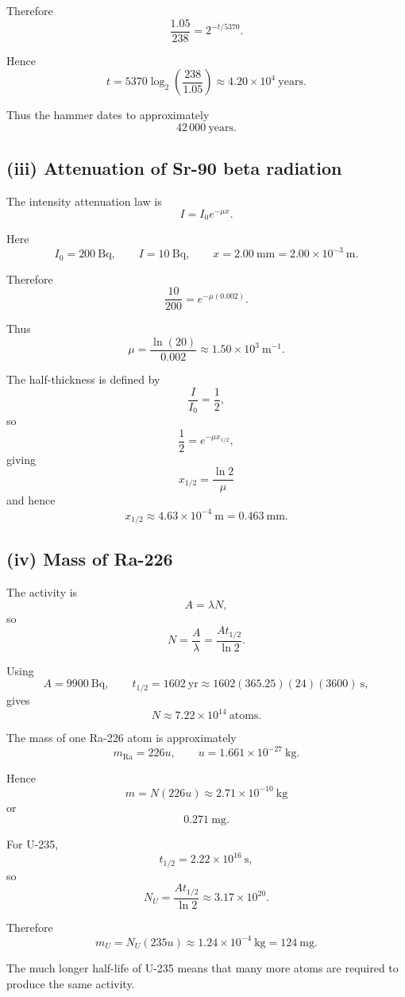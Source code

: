 \documentclass[11pt,a4paper]{article}
\begin{document}
Therefore
\[
\frac{1.05}{238}
=
2^{-t/5370}.
\]

Hence
\[
t
=
5370
\log_2\left(\frac{238}{1.05}\right)
\approx
\boxed{4.20\times10^4\ \mathrm{years}}.
\]

Thus the hammer dates to approximately
\[
\boxed{42\,000\ \mathrm{years}}.
\]

\subsection{(iii) Attenuation of Sr-90 beta radiation}

The intensity attenuation law is
\[
I=I_0e^{-\mu x}.
\]

Here
\[
I_0=200\ \mathrm{Bq},
\qquad
I=10\ \mathrm{Bq},
\qquad
x=2.00\ \mathrm{mm}=2.00\times10^{-3}\ \mathrm m.
\]

Therefore
\[
\frac{10}{200}
=
e^{-\mu(0.002)}.
\]

Thus
\[
\mu
=
\frac{\ln(20)}{0.002}
\approx
\boxed{1.50\times10^3\ \mathrm{m^{-1}}}.
\]

The half-thickness is defined by
\[
\frac{I}{I_0}=\frac12,
\]
so
\[
\frac12=e^{-\mu x_{1/2}},
\]
giving
\[
\boxed{x_{1/2}=\frac{\ln2}{\mu}}
\]
and hence
\[
\boxed{x_{1/2}\approx4.63\times10^{-4}\ \mathrm m
=0.463\ \mathrm{mm}}.
\]

\subsection{(iv) Mass of Ra-226}

The activity is
\[
A=\lambda N,
\]
so
\[
N=\frac{A}{\lambda}
=
\frac{At_{1/2}}{\ln2}.
\]

Using
\[
A=9900\ \mathrm{Bq},
\qquad
t_{1/2}=1602\ \mathrm{yr}
\approx1602(365.25)(24)(3600)\ \mathrm s,
\]
gives
\[
N\approx7.22\times10^{14}\ \text{atoms}.
\]

The mass of one Ra-226 atom is approximately
\[
m_{\mathrm{Ra}}
=
226u,
\qquad
u=1.661\times10^{-27}\ \mathrm{kg}.
\]

Hence
\[
m
=
N(226u)
\approx
\boxed{2.71\times10^{-10}\ \mathrm{kg}}
\]
or
\[
\boxed{0.271\ \mathrm{mg}}.
\]

For U-235,
\[
t_{1/2}=2.22\times10^{16}\ \mathrm s,
\]
so
\[
N_U
=
\frac{A t_{1/2}}{\ln2}
\approx
3.17\times10^{20}.
\]

Therefore
\[
m_U
=
N_U(235u)
\approx
\boxed{1.24\times10^{-4}\ \mathrm{kg}}
=
\boxed{124\ \mathrm{mg}}.
\]

The much longer half-life of U-235 means that many more atoms are required to
produce the same activity.
\end{document}
